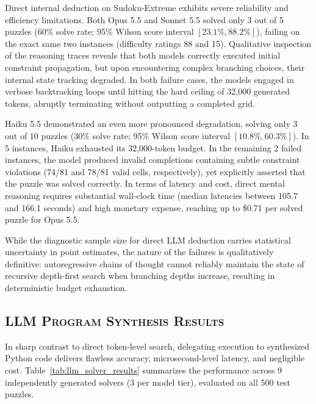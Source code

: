 \documentclass{article} %
\begin{document}
Direct internal deduction on Sudoku-Extreme exhibits severe reliability and efficiency limitations. Both Opus 5.5 and Sonnet 5.5 solved only 3 out of 5 puzzles (60\% solve rate; 95\% Wilson score interval $[23.1\%, 88.2\%]$), failing on the exact same two instances (difficulty ratings 88 and 15). Qualitative inspection of the reasoning traces reveals that both models correctly executed initial constraint propagation, but upon encountering complex branching choices, their internal state tracking degraded. In both failure cases, the models engaged in verbose backtracking loops until hitting the hard ceiling of 32,000 generated tokens, abruptly terminating without outputting a completed grid.

Haiku 5.5 demonstrated an even more pronounced degradation, solving only 3 out of 10 puzzles (30\% solve rate; 95\% Wilson score interval $[10.8\%, 60.3\%]$). In 5 instances, Haiku exhausted its 32,000-token budget. In the remaining 2 failed instances, the model produced invalid completions containing subtle constraint violations (74/81 and 78/81 valid cells, respectively), yet explicitly asserted that the puzzle was solved correctly. In terms of latency and cost, direct mental reasoning requires substantial wall-clock time (median latencies between 105.7 and 166.1 seconds) and high monetary expense, reaching up to \$0.71 per solved puzzle for Opus 5.5.

While the diagnostic sample size for direct LLM deduction carries statistical uncertainty in point estimates, the nature of the failures is qualitatively definitive: autoregressive chains of thought cannot reliably maintain the state of recursive depth-first search when branching depths increase, resulting in deterministic budget exhaustion.

\subsection{\textsc{LLM Program Synthesis Results}}
\label{subsec:program_synthesis_results}

In sharp contrast to direct token-level search, delegating execution to synthesized Python code delivers flawless accuracy, microsecond-level latency, and negligible cost. Table~\ref{tab:llm_solver_results} summarizes the performance across 9 independently generated solvers (3 per model tier), evaluated on all 500 test puzzles.
\end{document}
